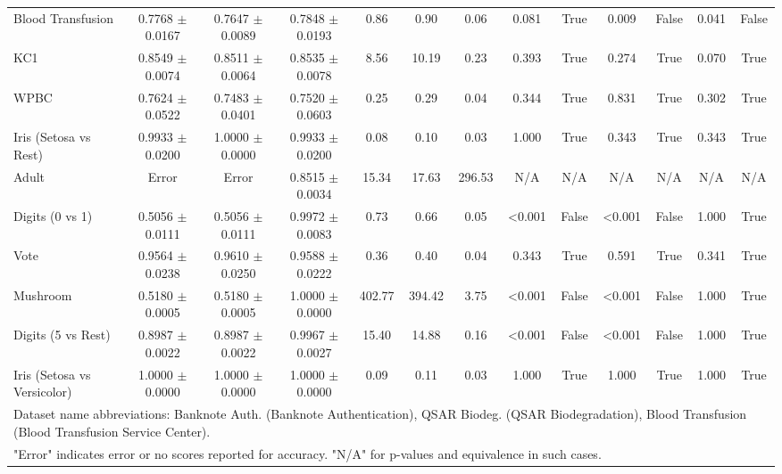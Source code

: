 \documentclass[conference]{IEEEtran}
\begin{document}
\begin{table}[htbp]
{\begin{tabular}{@{}lcccccccccccc@{}}
Blood Transfusion & 0.7768 $\pm$ 0.0167 & 0.7647 $\pm$ 0.0089 & 0.7848 $\pm$ 0.0193 & 0.86 & 0.90 & 0.06 & 0.081 & True & 0.009 & False & 0.041 & False \\
KC1 & 0.8549 $\pm$ 0.0074 & 0.8511 $\pm$ 0.0064 & 0.8535 $\pm$ 0.0078 & 8.56 & 10.19 & 0.23 & 0.393 & True & 0.274 & True & 0.070 & True \\
WPBC & 0.7624 $\pm$ 0.0522 & 0.7483 $\pm$ 0.0401 & 0.7520 $\pm$ 0.0603 & 0.25 & 0.29 & 0.04 & 0.344 & True & 0.831 & True & 0.302 & True \\
Iris (Setosa vs Rest) & 0.9933 $\pm$ 0.0200 & 1.0000 $\pm$ 0.0000 & 0.9933 $\pm$ 0.0200 & 0.08 & 0.10 & 0.03 & 1.000 & True & 0.343 & True & 0.343 & True \\
Adult & Error & Error & 0.8515 $\pm$ 0.0034 & 15.34 & 17.63 & 296.53 & N/A & N/A & N/A & N/A & N/A & N/A \\
Digits (0 vs 1) & 0.5056 $\pm$ 0.0111 & 0.5056 $\pm$ 0.0111 & 0.9972 $\pm$ 0.0083 & 0.73 & 0.66 & 0.05 & <0.001 & False & <0.001 & False & 1.000 & True \\
Vote & 0.9564 $\pm$ 0.0238 & 0.9610 $\pm$ 0.0250 & 0.9588 $\pm$ 0.0222 & 0.36 & 0.40 & 0.04 & 0.343 & True & 0.591 & True & 0.341 & True \\
Mushroom & 0.5180 $\pm$ 0.0005 & 0.5180 $\pm$ 0.0005 & 1.0000 $\pm$ 0.0000 & 402.77 & 394.42 & 3.75 & <0.001 & False & <0.001 & False & 1.000 & True \\
Digits (5 vs Rest) & 0.8987 $\pm$ 0.0022 & 0.8987 $\pm$ 0.0022 & 0.9967 $\pm$ 0.0027 & 15.40 & 14.88 & 0.16 & <0.001 & False & <0.001 & False & 1.000 & True \\
Iris (Setosa vs Versicolor) & 1.0000 $\pm$ 0.0000 & 1.0000 $\pm$ 0.0000 & 1.0000 $\pm$ 0.0000 & 0.09 & 0.11 & 0.03 & 1.000 & True & 1.000 & True & 1.000 & True \\
\bottomrule
\multicolumn{13}{l}{Dataset name abbreviations: Banknote Auth. (Banknote Authentication), QSAR Biodeg. (QSAR Biodegradation), Blood Transfusion (Blood Transfusion Service Center).} \\
\multicolumn{13}{l}{"Error" indicates error or no scores reported for accuracy. "N/A" for p-values and equivalence in such cases.}
\end{tabular}%
}
\end{table}
\end{document}
